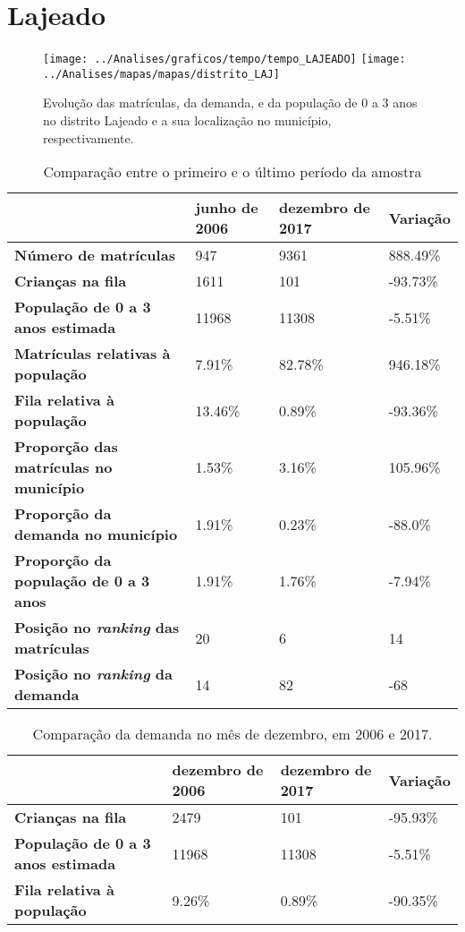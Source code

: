 \section{Lajeado}
\begin{figure}[H]
	\centering
	\texttt{[image: ../Analises/graficos/tempo/tempo\_LAJEADO]}
	\texttt{[image: ../Analises/mapas/mapas/distrito\_LAJ]}
	\caption{Evolução das matrículas, da demanda, e da população de 0 a 3 anos no distrito Lajeado e a sua localização no município, respectivamente.}
\end{figure}
\begin{table}[H]
	\begin{tabular}{|l|l|l|l|}
		\hline
		\textbf{}                                      & \textbf{junho de 2006}       & \textbf{dezembro de 2017}    & \textbf{Variação} \\ \hline
		\textbf{Número de matrículas}                  & 947 & 9361 & 888.49\% \\ \hline
		\textbf{Crianças na fila}                      & 1611 & 101 & -93.73\% \\ \hline
		\textbf{População de 0 a 3 anos estimada}      & 11968 & 11308 & -5.51\% \\ \hline
		\textbf{Matrículas relativas à população}      & 7.91\% & 82.78\% & 946.18\% \\ \hline
		\textbf{Fila relativa à população}             & 13.46\% & 0.89\% & -93.36\% \\ \hline
		\textbf{Proporção das matrículas no município} & 1.53\% & 3.16\% & 105.96\% \\ \hline
		\textbf{Proporção da demanda no município}     & 1.91\% & 0.23\% & -88.0\% \\ \hline
		\textbf{Proporção da população de 0 a 3 anos}  & 1.91\% & 1.76\% & -7.94\% \\ \hline
		\textbf{Posição no \textit{ranking} das matrículas}     & 20 & 6 & 14 \\ \hline
		\textbf{Posição no \textit{ranking} da demanda}         & 14 & 82 & -68 \\ \hline
	\end{tabular}
	\caption{Comparação entre o primeiro e o último período da amostra}
\end{table}
\begin{table}[H]
	\begin{tabular}{|l|l|l|l|}
		\hline
		\textbf{}                                 & \textbf{dezembro de 2006} & \textbf{dezembro de 2017} & \textbf{Variação} \\ \hline
		\textbf{Crianças na fila}                      & 2479 & 101 & -95.93\% \\ \hline
		\textbf{População de 0 a 3 anos estimada}      & 11968 & 11308 & -5.51\% \\ \hline
		\textbf{Fila relativa à população}             & 9.26\% & 0.89\% & -90.35\% \\ \hline
	\end{tabular}
	\caption{Comparação da demanda no mês de dezembro, em 2006 e 2017.}
\end{table}
